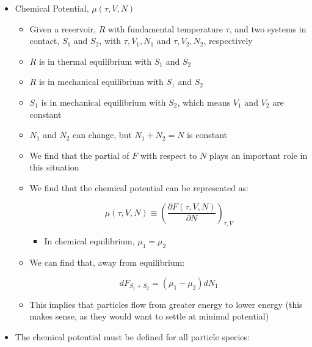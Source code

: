 \begin{itemize}

  \item Chemical Potential, $\mu(\tau, V, N)$

    \begin{itemize}

      \item Given a reservoir, $R$ with fundamental temperature $\tau$, and two systems in contact, $S_1$ and $S_2$, with $\tau, V_1,N_1$ and $\tau,V_2,N_2$, respectively

      \item $R$ is in thermal equilibrium with $S_1$ and $S_2$

      \item $R$ is in mechanical equilibrium with $S_1$ and $S_2$

      \item $S_1$ is in mechanical equilibrium with $S_2$, which means $V_1$ and $V_2$ are constant

      \item $N_1$ and $N_2$ can change, but $N_1+N_2=N$ is constant

      \item We find that the partial of $F$ with respect to $N$ plays an important role in this situation

      \item We find that the chemical potential can be represented as:

        $$\mu(\tau,V,N)\equiv\left( \frac{\partial F(\tau,V,N)}{\partial N} \right)_{\tau,V}$$

        \begin{itemize}

          \item In chemical equilibrium, $\mu_1=\mu_2$

        \end{itemize}

      \item We can find that, away from equilibrium:

        $$dF_{S_1+S_2}=(\mu_1-\mu_2)dN_1$$

      \item This implies that particles flow from greater energy to lower energy (this makes sense, as they would want to settle at minimal potential)

    \end{itemize}

  \item The chemical potential must be defined for all particle species:


\end{itemize}
